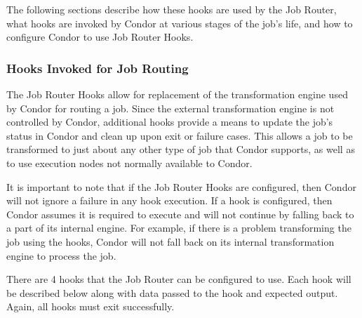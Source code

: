 The following sections describe how these hooks are used by the Job Router,
what hooks are invoked by Condor at various stages of the job's life, 
and how to configure Condor to use Job Router Hooks.

\subsubsection{\label{sec:job-hooks-JR}
Hooks Invoked for Job Routing}

The Job Router Hooks allow for replacement of the transformation engine used
by Condor for routing a job.
Since the external transformation engine is not controlled by Condor,
additional hooks provide a means to update the job's
status in Condor and clean up upon exit or failure cases.
This allows a job to be transformed to just about any other type of job
that Condor supports,
as well as to use execution nodes not normally available to Condor.

It is important to note that if the Job Router Hooks are configured, 
then Condor will not ignore a failure in any hook execution.
If a hook is configured,
then Condor assumes it is required to execute and will not
continue by falling back to a part of its internal engine.
For example,
if there is a problem transforming the job using the hooks,
Condor will not fall back on its internal transformation engine 
to process the job.

There are 4 hooks that the Job Router can be configured to use.
Each hook will be described below along with data passed 
to the hook and expected output.
Again, all hooks must exit successfully.

